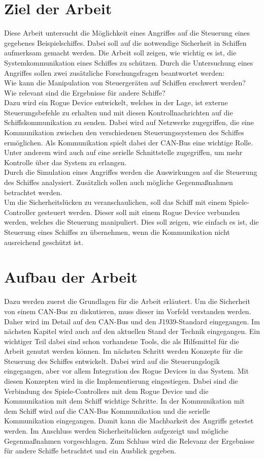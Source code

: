 \section{Ziel der Arbeit}
Diese Arbeit untersucht die Möglichkeit eines Angriffes auf die Steuerung eines gegebenes Beispielschiffes.
Dabei soll auf die notwendige Sicherheit in Schiffen aufmerksam gemacht werden.
Die Arbeit soll zeigen, wie wichtig es ist, die Systemkommunikation eines Schiffes zu schützen.
Durch die Untersuchung eines Angriffes sollen zwei zusätzliche Forschungsfragen beantwortet werden: \\
Wie kann die Manipulation von Steuergeräten auf Schiffen erschwert werden? \\
Wie relevant sind die Ergebnisse für andere Schiffe? \\
Dazu wird ein Rogue Device entwickelt, welches in der 
Lage, ist externe Steuerungsbefehle zu erhalten und mit diesen Kontrollnachrichten auf die Schiffskommunikation zu senden.
Dabei wird auf Netzwerke zugegriffen, die eine Kommunikation zwischen den verschiedenen Steuerungssystemen des Schiffes 
ermöglichen. Als Kommunikation spielt dabei der CAN-Bus eine wichtige Rolle.
Unter anderem wird auch 
auf eine serielle Schnittstelle zugegriffen, um mehr Kontrolle über das System zu erlangen. \\
Durch die Simulation eines Angriffes werden die Auswirkungen auf die Steuerung des 
Schiffes analysiert. Zusätzlich 
sollen auch mögliche Gegenmaßnahmen betrachtet werden. \\
Um die Sicherheitslücken zu veranschaulichen, soll das Schiff mit einem Spiele-Controller gesteuert werden.
Dieser soll mit einem Rogue Device verbunden werden, welches die Steuerung manipuliert.
Dies soll zeigen, wie einfach es ist, die Steuerung eines Schiffes zu übernehmen, wenn die Kommunikation nicht 
ausreichend geschützt ist.\\

\section{Aufbau der Arbeit}
Dazu werden zuerst die Grundlagen für die Arbeit erläutert. 
Um die Sicherheit von einem CAN-Bus zu diskutieren, muss dieser im Vorfeld verstanden werden. Daher wird
im Detail auf den CAN-Bus und den J1939-Standard eingegangen.
Im nächsten Kapitel wird auch auf den aktuellen Stand der Technik eingegangen.
Ein wichtiger Teil dabei sind schon vorhandene Tools, die als Hilfsmittel für die Arbeit genutzt werden können.
Im nächsten Schritt werden Konzepte für die Steuerung des Schiffes entwickelt. Dabei wird auf die Steuerungslogik eingegangen, aber
vor allem Integration des Rogue Devices in das System. Mit diesen Konzepten wird in die Implementierung eingestiegen. Dabei sind 
die Verbindung des Spiele-Controllers mit dem Rogue Device und die Kommunikation mit dem Schiff wichtige Schritte.
In der Kommunikation mit dem Schiff wird auf die CAN-Bus Kommunikation und die serielle Kommunikation eingegangen.
Damit kann die Machbarkeit des Angriffs getestet werden. Im Anschluss werden Sicherheitslücken aufgezeigt und mögliche Gegenmaßnahmen
vorgeschlagen. Zum Schluss wird die Relevanz der Ergebnisse für andere Schiffe betrachtet und ein Ausblick gegeben. \\
